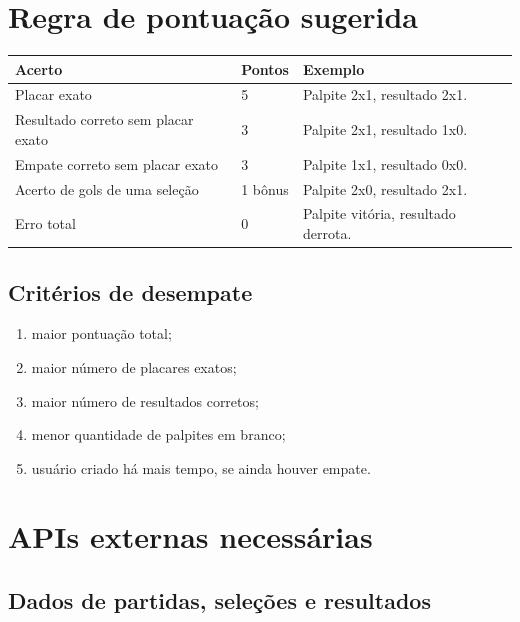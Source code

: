 \documentclass[12pt,a4paper]{article}
\begin{document}
\section{Regra de pontuação sugerida}

\begin{longtable}{p{}p{}p{}}
\toprule
\textbf{Acerto} & \textbf{Pontos} & \textbf{Exemplo} \\
\midrule
Placar exato & 5 & Palpite 2x1, resultado 2x1. \\
Resultado correto sem placar exato & 3 & Palpite 2x1, resultado 1x0. \\
Empate correto sem placar exato & 3 & Palpite 1x1, resultado 0x0. \\
Acerto de gols de uma seleção & 1 bônus & Palpite 2x0, resultado 2x1. \\
Erro total & 0 & Palpite vitória, resultado derrota. \\
\bottomrule
\end{longtable}

\subsection{Critérios de desempate}

\begin{enumerate}
  \item maior pontuação total;
  \item maior número de placares exatos;
  \item maior número de resultados corretos;
  \item menor quantidade de palpites em branco;
  \item usuário criado há mais tempo, se ainda houver empate.
\end{enumerate}

\section{APIs externas necessárias}

\subsection{Dados de partidas, seleções e resultados}
\end{document}
